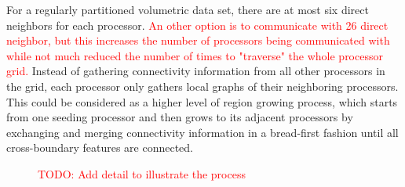\documentclass[10pt, conference, compsocconf]{IEEEtran}
\begin{document}
For a regularly partitioned volumetric data set, there are at most six direct neighbors for each processor. \textcolor{red}{An other option is to communicate with 26 direct neighbor, but this increases the number of processors being communicated with while not much reduced the number of times to "traverse" the whole processor grid.} Instead of gathering connectivity information from all other processors in the grid, each processor only gathers local graphs of their neighboring processors. This could be considered as a higher level of region growing process, which starts from one seeding processor and then grows to its adjacent processors by exchanging and merging connectivity information in a bread-first fashion until all cross-boundary features are connected.

\begin{figure}[ht]
  \centering
  \caption[Optional caption for list of figures]{\textcolor{red}{TODO: Add detail to illustrate the process}}
\end{figure}
\end{document}
